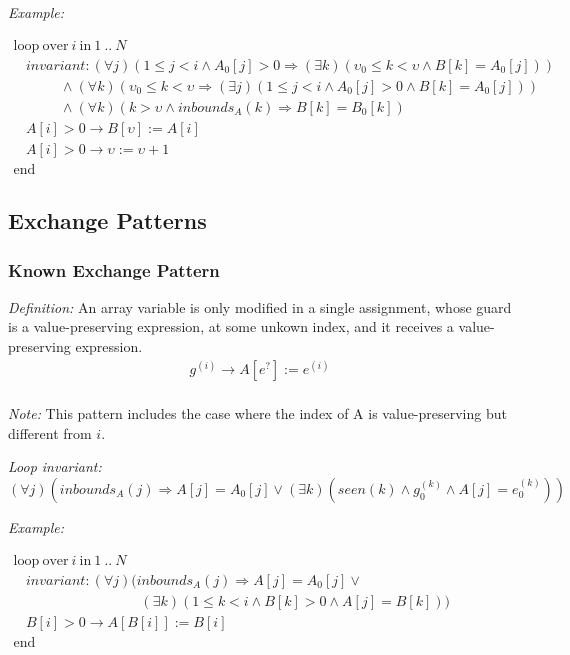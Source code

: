 \documentclass[a4paper,10pt]{article}
\newcommand{\idx}{\ensuremath{i}\xspace}
\newcommand{\at}[1]{{(#1)}}
\newcommand{\KWloop}{\ensuremath{\mathrm{loop}~}}
\newcommand{\KWend}{\ensuremath{\mathrm{end}~}}
\newcommand{\KWover}{\ensuremath{\mathrm{over}~}}
\newcommand{\KWin}{\ensuremath{~\mathrm{in}~}}
\newcommand{\impl}{\ensuremath{\Longrightarrow}}
\newcommand{\inbounds}[2]{\ensuremath{\mathit{inbounds}_{#1}(#2)}\xspace}
\newcommand{\seen}[1]{\ensuremath{\mathit{seen}(#1)}\xspace}
\newcommand{\loopinvariant}{\noindent\textit{Loop invariant:}\xspace}
\newcommand{\patterndef}{\noindent\textit{Definition:}\xspace}
\newcommand{\patternexample}{\noindent\textit{Example:}\xspace}
\newcommand{\patternnote}{\noindent\textit{Note:}\xspace}
\begin{document}
\bigskip
\patternexample

\medskip
$\begin{array}{l}
  \KWloop \KWover i \KWin 1~..~N \\
  ~~~~ \textit{invariant}: (\forall j)(1 \leq j < i \land A_0[j] > 0 \impl (\exists k)(\upsilon_0 \leq k < \upsilon \land B[k] = A_0[j]))\\
  ~~~~~~~~~~~~~~~ \land (\forall k)(\upsilon_0 \leq k < \upsilon \impl (\exists j)(1 \leq j < i \land  A_0[j] > 0 \land B[k] = A_0[j]))\\
  ~~~~~~~~~~~~~~~ \land (\forall k)(k > \upsilon \land \inbounds{A}{k} \impl B[k] = B_0[k])\\
  ~~~~ A[i] > 0 \rightarrow B[\upsilon] := A[i]\\
  ~~~~ A[i] > 0 \rightarrow \upsilon := \upsilon + 1\\
  \KWend
\end{array}$

\subsection{Exchange Patterns}

\subsubsection*{Known Exchange Pattern}

\patterndef An array variable is only modified in a single assignment,
whose guard is a value-preserving expression, at some unkown index, 
and it receives a value-preserving expression.
%
\begin{eqnarray*}
g^\at{\idx} \rightarrow A[e^?] := e^\at{\idx}\\
\end{eqnarray*}

%
\patternnote This pattern includes the case where the index of A is value-preserving but different from $i$.

\medskip
%
\loopinvariant
%
$$(\forall j)(\inbounds{A}{j} \impl A[j] = A_0[j] \lor (\exists k)(\seen{k} \land g_0^\at{k} \land A[j] = e_0^\at{k}))$$

\bigskip
\patternexample

\medskip
$\begin{array}{l}
  \KWloop \KWover i \KWin 1~..~N \\
  ~~~~ \textit{invariant}: (\forall j)(\inbounds{A}{j} \impl A[j] = A_0[j] \lor \\ 
  ~~~~~~~~~~~~~~~~~~~~~~~~~~~~~~~~~~~~~~~~~ (\exists k)(1 \leq k < i \land B[k] > 0 \land A[j] = B[k]))\\
  ~~~~ B[i] > 0 \rightarrow A[B[i]] := B[i]\\
  \KWend
\end{array}$
\end{document}

